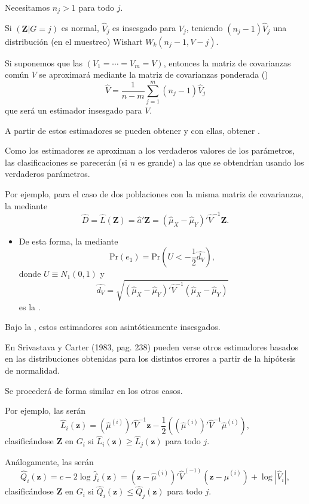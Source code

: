 Necesitamos $n_j>1$ para todo $j$.

Si $(\mathbf{Z}|G=j)$ es normal, $\hat{V}_j$ es insesgado para $V_j$, teniendo $(n_j-1)\hat{V}_j$ una distribución (en el muestreo) Wishart $W_k(n_j-1,V-j)$.

Si suponemos que las  $(V_1=\cdots=V_m=V)$, entonces la matriz de covarianzas común $V$ se aproximará mediante la matriz de covarianzas ponderada () \[ \hat{V}=\dfrac{1}{n-m}\sum_{j=1}^{m}(n_j-1)\hat{V}_j \] que será un estimador insesgado para $V$.

A partir de estos estimadores se pueden obtener  y con ellas, obtener .

Como los estimadores se aproximan a los verdaderos valores de los parámetros, las clasificaciones se parecerán (si $n$ es grande) a las que se obtendrían usando los verdaderos parámetros.

Por ejemplo, para el caso de dos poblaciones con la misma matriz de covarianzas, la  mediante \[ \hat{D}=\hat{L}(\mathbf{Z})=\hat{a}'\mathbf{Z}=(\hat{\mu}_X-\hat{\mu}_Y)'\hat{V}^{-1}\mathbf{Z}. \]
\begin{itemize}
\item De esta forma, la  mediante \[ \mathrm{Pr}(e_1)=\mathrm{Pr}\left(U<-\dfrac{1}{2}\hat{d_V}\right), \]donde $U\equiv N_1(0,1)$ y \[ \hat{d_V}=\sqrt{(\hat{\mu}_X-\hat{\mu}_Y)'\hat{V}^{-1}(\hat{\mu}_X-\hat{\mu}_Y)} \]es la .
\end{itemize}
Bajo la , estos estimadores son asintóticamente insesgados.

En Srivastava y Carter (1983, pag. 238) pueden verse otros estimadores basados en las distribuciones obtenidas para los distintos errores a partir de la hipótesis de normalidad.

Se procederá de forma similar en los otros casos.

Por ejemplo, las  serán \[ \hat{L}_i(\mathbf{z})=(\hat{\mu}^{(i)})'\hat{V}^{-1}\mathbf{z}-\dfrac{1}{2}\left((\hat{\mu}^{(i)})'\hat{V}^{-1}\hat{\mu}^{(i)}\right), \]clasificándose \textbf{Z} en $G_i$ si $\hat{L}_i(\mathbf{z})\ge\hat{L}_j(\mathbf{z})$ para todo $j$.

Análogamente, las  serán \[ \hat{Q}_i(\mathbf{z})=c-2\log\hat{f}_i(\mathbf{z})=(\mathbf{z}-\hat{\mu}^{(i)})'\hat{V}^{(-1)}(\mathbf{z}-\hat{\mu}^{(i)})+\log|\hat{V}_i|, \]clasificándose \textbf{Z} en $G_i$ si $\hat{Q}_i(\mathbf{z})\le \hat{Q}_j(\mathbf{z})$ para todo $j$.